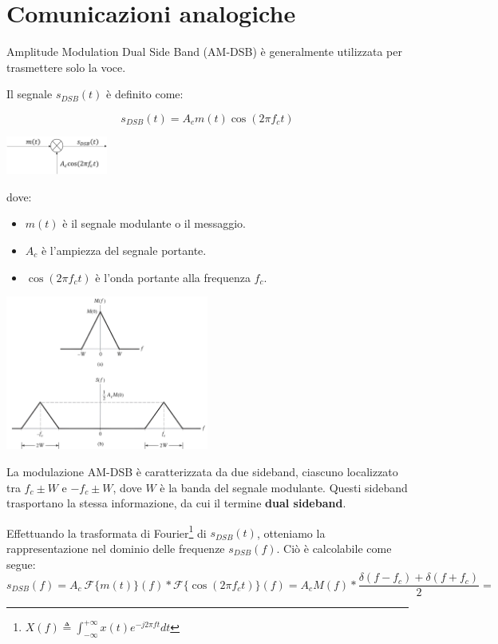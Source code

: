 \section*{Comunicazioni analogiche}

Amplitude Modulation Dual Side Band (AM-DSB) è generalmente utilizzata per trasmettere solo la voce.


Il segnale \( s_{DSB}(t) \) è definito come:

\begin{equation*}
    s_{DSB}(t) = A_c m(t) \cos(2\pi f_c t)
\end{equation*}

\begin{center}
    \includegraphics[width=0.25\textwidth]{imgs/analog_pam_trasmitter.png}
\end{center}


dove:
\begin{itemize}
    \item \( m(t) \) è il segnale modulante o il messaggio.
    \item \( A_c \) è l'ampiezza del segnale portante.
    \item \( \cos(2\pi f_c t) \) è l'onda portante alla frequenza \( f_c \).
\end{itemize}

\begin{center}
    \includegraphics[width=0.5\textwidth]{imgs/dsb.jpg}
\end{center}


La modulazione AM-DSB è caratterizzata da due sideband, ciascuno localizzato tra \( f_c \pm W \) e \( -f_c \pm W \), dove \( W \) è la banda del segnale modulante. Questi sideband trasportano la stessa informazione, da cui il termine \textbf{dual sideband}.

Effettuando la trasformata di Fourier\footnote{$X(f) \triangleq \int_{-\infty}^{+\infty} x(t) e^{-j2\pi ft} dt$} di \( s_{DSB}(t) \), otteniamo la rappresentazione nel dominio delle frequenze \( s_{DSB}(f) \). Ciò è calcolabile come segue:
\[
    s_{DSB}(f) = A_c \ \mathcal{F}\{m(t)\} (f)  \ast \mathcal{F}\{\cos(2\pi f_c t) \}(f) = A_c M(f) \ast \frac{\delta(f - f_c) + \delta(f + f_c)}{2} =
\]

